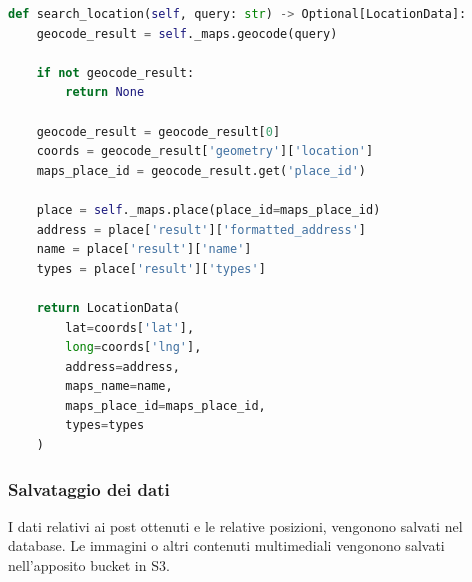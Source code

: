 \begin{lstlisting}[language=Python, caption=Ottenimento informazioni da \textit{Google Maps API}]
def search_location(self, query: str) -> Optional[LocationData]:
    geocode_result = self._maps.geocode(query)

    if not geocode_result:
        return None

    geocode_result = geocode_result[0]
    coords = geocode_result['geometry']['location']
    maps_place_id = geocode_result.get('place_id')

    place = self._maps.place(place_id=maps_place_id)
    address = place['result']['formatted_address']
    name = place['result']['name']
    types = place['result']['types']

    return LocationData(
        lat=coords['lat'],
        long=coords['lng'],
        address=address,
        maps_name=name,
        maps_place_id=maps_place_id,
        types=types
    )
\end{lstlisting}
    

\subsubsection{Salvataggio dei dati}
I dati relativi ai post ottenuti e le relative posizioni, vengonono salvati nel database.
Le immagini o altri contenuti multimediali vengonono salvati nell'apposito bucket in S3.
